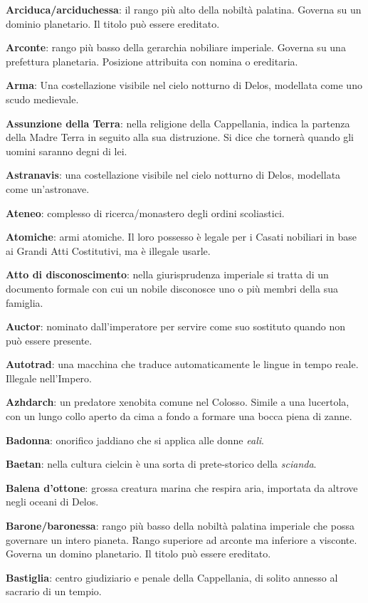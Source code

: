 \textbf{Arciduca/arciduchessa}: il rango più alto della nobiltà
palatina. Governa su un dominio planetario. Il titolo può essere
ereditato.

\textbf{Arconte}: rango più basso della gerarchia nobiliare imperiale.
Governa su una prefettura planetaria. Posizione attribuita con nomina o
ereditaria.

\textbf{Arma}: Una costellazione visibile nel cielo notturno di Delos,
modellata come uno scudo medievale.

\textbf{Assunzione della Terra}: nella religione della Cappellania,
indica la partenza della Madre Terra in seguito alla sua distruzione. Si
dice che tornerà quando gli uomini saranno degni di lei.

\textbf{Astranavis}: una costellazione visibile nel cielo notturno di
Delos, modellata come un'astronave.

\textbf{Ateneo}: complesso di ricerca/monastero degli ordini
scoliastici.

\textbf{Atomiche}: armi atomiche. Il loro possesso è legale per i Casati
nobiliari in base ai Grandi Atti Costitutivi, ma è illegale usarle.

\textbf{Atto di disconoscimento}: nella giurisprudenza imperiale si
tratta di un documento formale con cui un nobile disconosce uno o più
membri della sua famiglia.

\textbf{Auctor}: nominato dall'imperatore per servire come suo sostituto
quando non può essere presente.

\textbf{Autotrad}: una macchina che traduce automaticamente le lingue in
tempo reale. Illegale nell'Impero.

\textbf{Azhdarch}: un predatore xenobita comune nel Colosso. Simile a
una lucertola, con un lungo collo aperto da cima a fondo a formare una
bocca piena di zanne.

\textbf{Badonna}: onorifico jaddiano che si applica alle donne
\emph{eali}.

\textbf{Baetan}: nella cultura cielcin è una sorta di prete-storico
della \emph{scianda}.

\textbf{Balena d'ottone}: grossa creatura marina che respira aria,
importata da altrove negli oceani di Delos.

\textbf{Barone/baronessa}: rango più basso della nobiltà palatina
imperiale che possa governare un intero pianeta. Rango superiore ad
arconte ma inferiore a visconte. Governa un domino planetario. Il titolo
può essere ereditato.

\textbf{Bastiglia}: centro giudiziario e penale della Cappellania, di
solito annesso al sacrario di un tempio.

